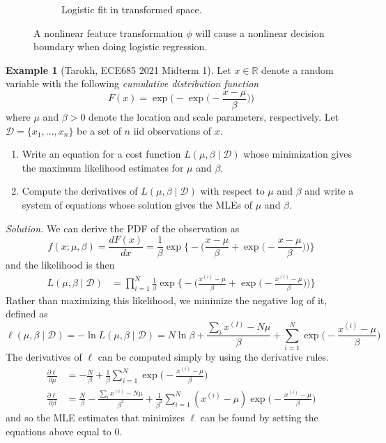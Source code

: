 \documentclass{article}
\theoremstyle{definition}
\newtheorem{example}{Example}[section]
\theoremstyle{remark}
\theoremstyle{definition}
\newenvironment{solution}{\noindent \textit{Solution.}}{}
\begin{document}
\begin{figure}[hbt!]
\begin{subfigure}[b]{0.35\textwidth}
          \caption{Logistic fit in transformed space. }
          \label{fig:transformed_trained}
      \end{subfigure}
      \caption{A nonlinear feature transformation $\phi$ will cause a nonlinear decision boundary when doing logistic regression. }
      \label{fig:logistic_transformed}
    \end{figure}

    \begin{example}[Tarokh, ECE685 2021 Midterm 1]
      Let $x \in \mathbb{R}$ denote a random variable with the following \textit{cumulative distribution function} 
        \[F(x) = \exp \bigg( - \exp \bigg( - \frac{x - \mu}{\beta} \bigg) \bigg) \] 
      where $\mu$ and $\beta > 0$ denote the location and scale parameters, respectively. Let $\mathcal{D} = \{x_1, \ldots, x_n\}$ be a set of $n$ iid observations of $x$. 
      \begin{enumerate}
        \item Write an equation for a cost function $L(\mu, \beta \mid \mathcal{D})$ whose minimization gives the maximum likelihood estimates for $\mu$ and $\beta$. 
        \item Compute the derivatives of $L(\mu, \beta \mid \mathcal{D})$ with respect to $\mu$ and $\beta$ and write a system of equations whose solution gives the MLEs of $\mu$ and $\beta$. 
      \end{enumerate}
    \end{example}

    \begin{solution}
      We can derive the PDF of the observation as 
        \[f(x; \mu, \beta) = \frac{d F(x)}{dx} = \frac{1}{\beta} \exp \bigg\{ - \bigg( \frac{x - \mu}{\beta} + \exp \Big( - \frac{x - \mu}{\beta}\Big) \bigg) \bigg\}\] 
      and the likelihood is then 
      \begin{align*}
        L(\mu, \beta \mid \mathcal{D}) & = \prod_{i=1}^N \frac{1}{\beta} \exp \bigg\{ - \bigg( \frac{x^{(i)} - \mu}{\beta} + \exp \Big( - \frac{x^{(i)} - \mu}{\beta}\Big) \bigg) \bigg\}
      \end{align*}
      Rather than maximizing this likelihood, we minimize the negative log of it, defined as 
        \[ \ell(\mu, \beta \mid \mathcal{D}) = - \ln L(\mu, \beta \mid \mathcal{D}) = N \ln{\beta} + \frac{\sum_{i} x^{(I)} - N \mu}{\beta} + \sum_{i=1}^N \exp \Big( - \frac{x^{(i)} - \mu}{\beta} \Big) \]    
      The derivatives of $\ell$ can be computed simply by using the derivative rules.  
      \begin{align*}
        \frac{\partial \ell}{\partial \mu} & = - \frac{N}{\beta} + \frac{1}{\beta} \sum_{i=1}^N \exp \Big( - \frac{x^{(i)} - \mu}{\beta} \Big) \\
        \frac{\partial \ell}{\partial \beta} & = \frac{N}{\beta} - \frac{\sum_{i} x^{(i)} - N \mu}{\beta^2} + \frac{1}{\beta^2} \sum_{i=1}^N (x^{(i)} - \mu) \exp \Big( - \frac{x^{(i)} - \mu}{\beta} \Big)
      \end{align*}
      and so the MLE estimates that minimizes $\ell$ can be found by setting the equations above equal to $0$. 
    \end{solution}
\end{document}
